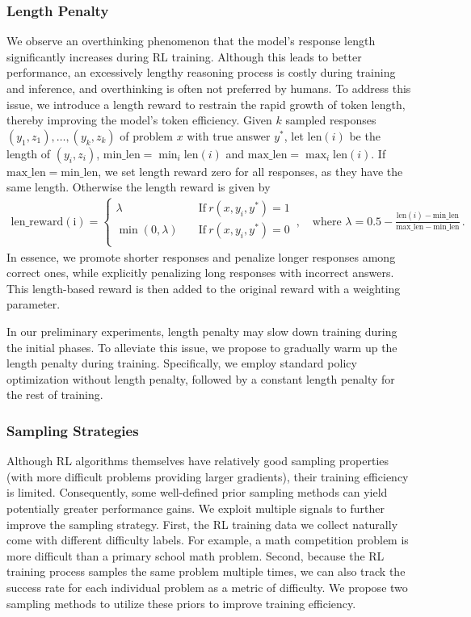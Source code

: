 \documentclass{article}
\begin{document}
\subsubsection{Length Penalty}
\label{sec:lengthpenalty}
We observe an overthinking phenomenon that the model's response length significantly increases during RL training. 
Although this leads to better performance, an excessively lengthy reasoning process is costly during training and inference, and overthinking is often not preferred by humans.
To address this issue, we introduce a length reward to restrain the rapid growth of token length, thereby improving the model's token efficiency. 
Given $k$ sampled responses $(y_1, z_1),\dots,(y_k,z_k)$ of problem $x$ with true answer $y^*$, let $\mathrm{len}(i)$ be the length of $(y_i, z_i)$, $\mathrm{min\_len}=\min_i \mathrm{len}(i)$ and $\mathrm{max\_len}=\max_i \mathrm{len}(i)$. 
If $\mathrm{max\_len}=\mathrm{min\_len}$, we set length reward zero for all responses, as they have the same length. Otherwise the length reward is given by
\begin{align*}
\mathrm{len\_reward(i)} = 
\left\{
\begin{aligned}
\lambda & \quad \text{If}\ r(x, y_i, y^*) = 1 \\
\min(0, \lambda )& \quad \text{If}\ r(x, y_i, y^*) = 0\\
\end{aligned}
\right.\, ,\quad
\text{where } \lambda  = 0.5 - \frac{\mathrm{len}(i) - \mathrm{min\_len}}{\mathrm{max\_len} - \mathrm{min\_len}} \, .
\end{align*}
In essence, we promote shorter responses and penalize longer responses among correct ones, while explicitly penalizing long responses with incorrect answers. 
This length-based reward is then added to the original reward with a weighting parameter.

In our preliminary experiments, length penalty may slow down training during the initial phases. To alleviate this issue, we propose to gradually warm up the length penalty during training. Specifically, we employ standard policy optimization without length penalty, followed by a constant length penalty for the rest of training.


\subsubsection{Sampling Strategies}
\label{sec:sampling}


Although RL algorithms themselves have relatively good sampling properties (with more difficult problems providing larger gradients), their training efficiency is limited. Consequently, some well-defined prior sampling methods can yield potentially greater performance gains.
We exploit multiple signals to further improve the sampling strategy.
First, the RL training data we collect naturally come with different difficulty labels. For example, a math competition problem is more difficult than a primary school math problem.
Second, because the RL training process samples the same problem multiple times, we can also track the success rate for each individual problem as a metric of difficulty.
We propose two sampling methods to utilize these priors to improve training efficiency.
\end{document}
